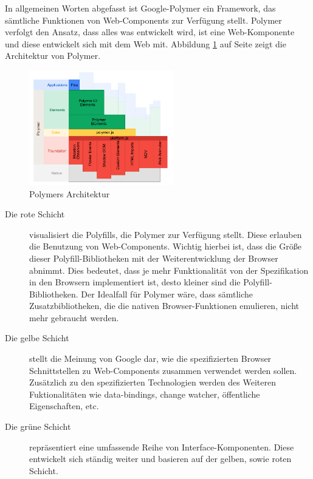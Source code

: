 
In allgemeinen Worten abgefasst ist Google-Polymer ein Framework, das sämtliche Funktionen von Web-Components zur Verfügung stellt. Polymer verfolgt den Ansatz, dass alles was entwickelt wird, ist eine Web-Komponente und diese entwickelt sich mit dem Web mit. Abbildung \ref{fig:3_polymer_architecture} auf Seite \pageref{fig:3_polymer_architecture} zeigt die Architektur von Polymer.


\begin{figure}[h]
\centering
\includegraphics[height=5.0cm]{images/polymer_architecture.png}
\caption[
Polymers Architektur, Urldate: 04.2014 \newline
\small\texttt{http://www.polymer-project.org/images/architecture-diagram.svg}
]{Polymers Architektur}
\label{fig:3_polymer_architecture}
\end{figure}

\begin{description}
\item[Die rote Schicht] visualisiert die Polyfills, die Polymer zur Verfügung stellt. Diese erlauben die Benutzung von Web-Components. Wichtig hierbei ist, dass die Größe dieser Polyfill-Bibliotheken mit der Weiterentwicklung der Browser abnimmt. Dies bedeutet, dass je mehr Funktionalität von der Spezifikation in den Browsern implementiert ist, desto kleiner sind die Polyfill-Bibliotheken. Der Idealfall für Polymer wäre, dass sämtliche Zusatzbibliotheken, die die nativen Browser-Funktionen emulieren, nicht mehr gebraucht werden.
\item[Die gelbe Schicht] stellt die Meinung von Google dar, wie die spezifizierten Browser Schnittstellen zu Web-Components zusammen verwendet werden sollen. Zusätzlich zu den spezifizierten Technologien werden des Weiteren Fuktionalitäten wie \glqq data-bindings\grqq , \glqq change watcher\grqq , \glqq öffentliche Eigenschaften\grqq , etc.
\item[Die grüne Schicht] repräsentiert eine umfassende Reihe von Interface-Komponenten. Diese entwickelt sich ständig weiter und basieren auf der gelben, sowie roten Schicht.
\end{description}

